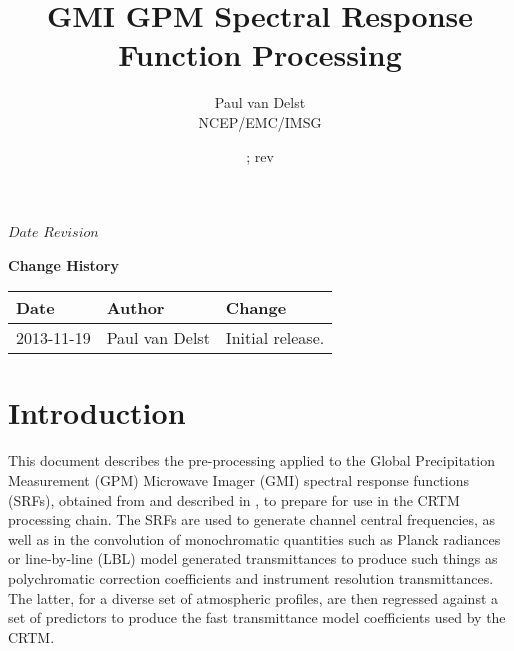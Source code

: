 



\SVN $Date$
\SVN $Revision$

\title{GMI GPM Spectral Response Function Processing}
\author{Paul van Delst\\NCEP/EMC/IMSG}
\date{\SVNDate ; rev\SVNRevision}



\maketitle


\thispagestyle{empty}
\vspace*{10cm}
\begin{center}
  {\sffamily\Large\bfseries Change History}
  \begin{table}[htp]
    \centering
    \begin{tabular}{|p{2cm}|p{3cm}|p{8cm}|}
      \hline
      \sffamily\textbf{Date} & \sffamily\textbf{Author} & \sffamily\textbf{Change}\\
      \hline\hline
      2013-11-19 & Paul van Delst & Initial release.\\
      \hline
    \end{tabular}
  \end{table}
\end{center}
\clearpage
\pagestyle{fancy}
\fancyhead[LE,RO]{\sffamily \rightmark}
\fancyhead[LO,RE]{\sffamily \leftmark}
\setcounter{page}{1}



\section{Introduction}
This document describes the pre-processing applied to the Global Precipitation Measurement (GPM) Microwave Imager (GMI) spectral response functions (SRFs), obtained from \cite{GMI_SRF_Data} and described in \citet{GMI_SER}, to prepare for use in the CRTM processing chain. The SRFs are used to generate channel central frequencies, as well as in the convolution of monochromatic quantities such as Planck radiances or line-by-line (LBL) model generated transmittances to produce such things as polychromatic correction coefficients and instrument resolution transmittances. The latter, for a diverse set of atmospheric profiles, are then regressed against a set of predictors to produce the fast transmittance model coefficients used by the CRTM.


